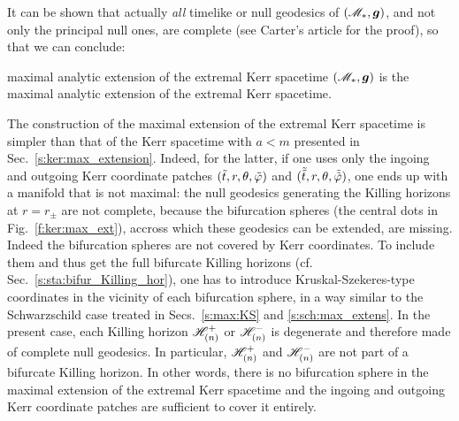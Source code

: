 It can be shown that actually \emph{all} timelike or null
geodesics of $(\mathscr{M}_*,\bm{g})$, and not only the principal null ones, are complete
(see Carter's article \cite{Carte68a} for the proof), so that we can conclude:
\begin{tprop}{maximal analytic extension of the extremal Kerr spacetime}{}
$(\mathscr{M}_*,\bm{g})$ is the maximal analytic extension of the
extremal Kerr spacetime.
\end{tprop}

\begin{remark}
The construction of the maximal extension of the extremal Kerr spacetime
is simpler than that of the Kerr spacetime with $a<m$ presented
in Sec.~\ref{s:ker:max_extension}. Indeed, for the latter, if one uses
only the ingoing and outgoing Kerr coordinate patches $({\tilde t},r,\theta,{\tilde\varphi})$
and $(\tilde{{\tilde t}},r,\theta,\tilde{{\tilde\varphi}})$, one ends up with a manifold that
is not maximal: the null geodesics generating the Killing horizons
at $r=r_\pm$ are not complete, because the bifurcation spheres
(the central dots in Fig.~\ref{f:ker:max_ext}), accross which these geodesics
can be extended, are missing.
Indeed the bifurcation spheres are not covered by Kerr coordinates.
To include them and thus get the full bifurcate Killing horizons
(cf. Sec.~\ref{s:sta:bifur_Killing_hor}), one has to introduce Kruskal-Szekeres-type
coordinates in the vicinity of each bifurcation sphere, in a way similar to
the Schwarzschild case treated in Secs.~\ref{s:max:KS} and \ref{s:sch:max_extens}.
In the present case, each Killing horizon $\mathscr{H}^+_{(n)}$ or $\mathscr{H}^-_{(n)}$
is degenerate and therefore made of complete null geodesics. In particular,
$\mathscr{H}^+_{(n)}$ and $\mathscr{H}^-_{(n)}$ are not part of a bifurcate Killing horizon. In other words, there
is no bifurcation sphere in the maximal extension of the extremal Kerr spacetime
and the ingoing and outgoing Kerr coordinate patches
are sufficient to cover it entirely.
\end{remark}

